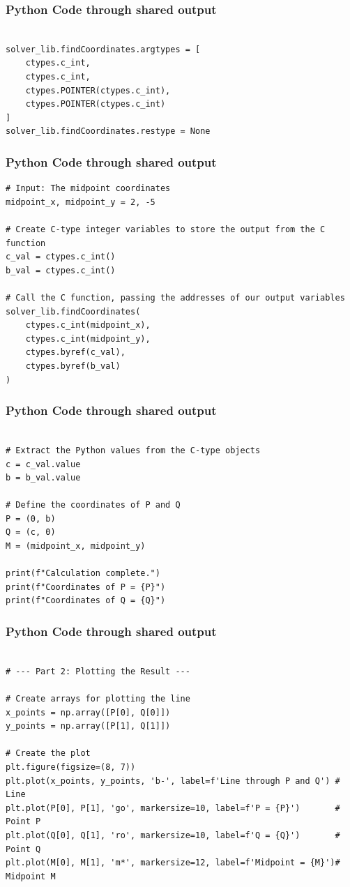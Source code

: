 \documentclass{beamer}
\begin{document}
\begin{frame}[fragile]
	\frametitle{Python Code through shared output}
	\begin{lstlisting}

solver_lib.findCoordinates.argtypes = [
    ctypes.c_int,
    ctypes.c_int,
    ctypes.POINTER(ctypes.c_int),
    ctypes.POINTER(ctypes.c_int)
]
solver_lib.findCoordinates.restype = None
\end{lstlisting}
\end{frame}
\begin{frame}[fragile]
	\frametitle{Python Code through shared output}
	\begin{lstlisting}
# Input: The midpoint coordinates
midpoint_x, midpoint_y = 2, -5

# Create C-type integer variables to store the output from the C function
c_val = ctypes.c_int()
b_val = ctypes.c_int()

# Call the C function, passing the addresses of our output variables
solver_lib.findCoordinates(
    ctypes.c_int(midpoint_x),
    ctypes.c_int(midpoint_y),
    ctypes.byref(c_val),
    ctypes.byref(b_val)
)
\end{lstlisting}
\end{frame}
\begin{frame}[fragile]
	\frametitle{Python Code through shared output}
	\begin{lstlisting}

# Extract the Python values from the C-type objects
c = c_val.value
b = b_val.value

# Define the coordinates of P and Q
P = (0, b)
Q = (c, 0)
M = (midpoint_x, midpoint_y)

print(f"Calculation complete.")
print(f"Coordinates of P = {P}")
print(f"Coordinates of Q = {Q}")
\end{lstlisting}
\end{frame}
\begin{frame}[fragile]
	\frametitle{Python Code through shared output}
	\begin{lstlisting}

# --- Part 2: Plotting the Result ---

# Create arrays for plotting the line
x_points = np.array([P[0], Q[0]])
y_points = np.array([P[1], Q[1]])

# Create the plot
plt.figure(figsize=(8, 7))
plt.plot(x_points, y_points, 'b-', label=f'Line through P and Q') # Line
plt.plot(P[0], P[1], 'go', markersize=10, label=f'P = {P}')       # Point P
plt.plot(Q[0], Q[1], 'ro', markersize=10, label=f'Q = {Q}')       # Point Q
plt.plot(M[0], M[1], 'm*', markersize=12, label=f'Midpoint = {M}')# Midpoint M
\end{lstlisting}
\end{frame}
\end{document}

